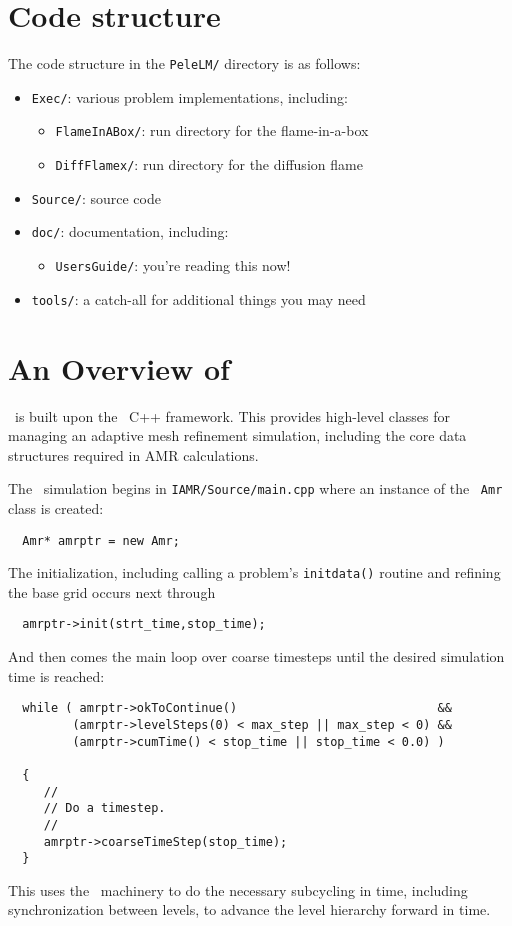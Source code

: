 \section{Code structure}

The code structure in the {\tt PeleLM/} directory is as follows:
\begin{itemize}
\item {\tt Exec/}: various problem implementations, including:
  \begin{itemize}
  \item {\tt FlameInABox/}: run directory for the flame-in-a-box
  \item {\tt DiffFlamex/}: run directory for the diffusion flame
  \end{itemize}

\item {\tt Source/}: source code

\item {\tt doc/}: documentation, including:
\begin{itemize}
 \item {\tt UsersGuide/}: you're reading this now!
\end{itemize}

\item {\tt tools/}: a catch-all for additional things you may need 
\end{itemize}


\section{An Overview of \pelelm}

\pelelm\ is built upon the \amrex\ C++ framework.  This provides
high-level classes for managing an adaptive mesh refinement simulation,
including the core data structures required in AMR calculations.

The \pelelm\ simulation begins in {\tt IAMR/Source/main.cpp} where an instance
of the \amrex\ {\tt Amr} class is created:
\begin{lstlisting}
  Amr* amrptr = new Amr;
\end{lstlisting}
The initialization, including calling a problem's {\tt initdata()}
routine and refining the base grid occurs next through
\begin{lstlisting}
  amrptr->init(strt_time,stop_time);
\end{lstlisting}
And then comes the main loop over coarse timesteps until the
desired simulation time is reached:
\begin{lstlisting}
  while ( amrptr->okToContinue()                            &&
         (amrptr->levelSteps(0) < max_step || max_step < 0) &&
         (amrptr->cumTime() < stop_time || stop_time < 0.0) )

  {
     //
     // Do a timestep.
     //
     amrptr->coarseTimeStep(stop_time);
  }
\end{lstlisting}
This uses the \amrex\ machinery to do the necessary subcycling in time,
including synchronization between levels, to advance the level hierarchy
forward in time.  

